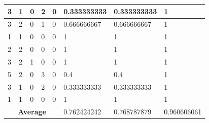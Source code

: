 \begin{small}
\begin{longtable}{|l|l|l|l|l|l|l|l|}
3  & 1                                & 0                                & 2                                & 0                                & 0.333333333                            & 0.333333333                             & 1                                    \\ \hline
3  & 2                                & 0                                & 1                                & 0                                & 0.666666667                            & 0.666666667                             & 1                                    \\ \hline
1  & 1                                & 0                                & 0                                & 0                                & 1                                      & 1                                       & 1                                    \\ \hline
2  & 2                                & 0                                & 0                                & 0                                & 1                                      & 1                                       & 1                                    \\ \hline
3  & 2                                & 1                                & 0                                & 0                                & 1                                      & 1                                       & 1                                    \\ \hline
5  & 2                                & 0                                & 3                                & 0                                & 0.4                                    & 0.4                                     & 1                                    \\ \hline
3  & 1                                & 0                                & 2                                & 0                                & 0.333333333                            & 0.333333333                             & 1                                    \\ \hline
1  & 1                                & 0                                & 0                                & 0                                & 1                                      & 1                                       & 1                                    \\ \hline
\multicolumn{5}{|c|}{\textbf{Average}}         & 0.762424242                            & 0.768787879                             & 0.960606061                          \\ \hline
\end{longtable}
\end{small}
\endgroup

